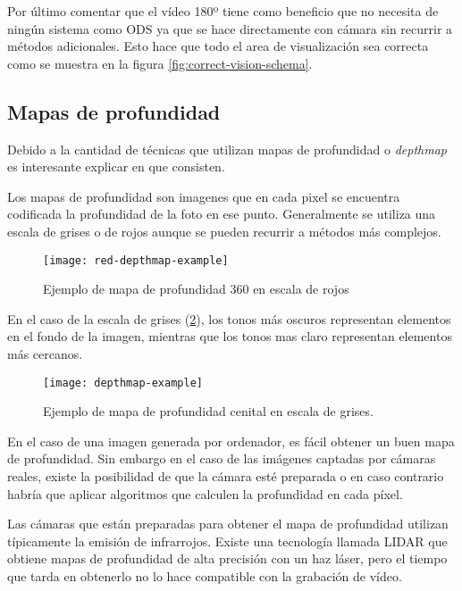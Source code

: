 Por último comentar que el vídeo 180º tiene como beneficio que no necesita de ningún sistema como ODS ya que se hace directamente con cámara sin recurrir a métodos adicionales. Esto hace que todo el area de visualización sea correcta como se muestra en la figura \ref{fig:correct-vision-schema}.

\subsection{Mapas de profundidad}
Debido a la cantidad de técnicas que utilizan mapas de profundidad o \textit{depthmap} es interesante explicar en que consisten. 

Los mapas de profundidad son imagenes que en cada pixel se encuentra codificada la profundidad de la foto en ese punto. Generalmente se utiliza una escala de grises o de rojos aunque se pueden recurrir a métodos más complejos.\cite{Josh6DoFUnity}

\begin{figure}[H]
  \centering
  \texttt{[image: red-depthmap-example]}
  \caption{Ejemplo de mapa de profundidad 360 en escala de rojos}
  \label{fig:red-depthmap-example}
\end{figure}
\FloatBarrier

En el caso de la escala de grises (\ref{fig:depthmap-example}), los tonos más oscuros representan elementos en el fondo de la imagen, mientras que los tonos mas claro representan elementos más cercanos.

\begin{figure}[H]
  \centering
  \texttt{[image: depthmap-example]}
  \caption{Ejemplo de mapa de profundidad cenital en escala de grises.}
  \label{fig:depthmap-example}
\end{figure}
\FloatBarrier

En el caso de una imagen generada por ordenador, es fácil obtener un buen mapa de profundidad. Sin embargo en el caso de las imágenes captadas por cámaras reales, existe la posibilidad de que la cámara esté preparada o en caso contrario habría que aplicar algoritmos que calculen la profundidad en cada píxel. 

Las cámaras que están preparadas para obtener el mapa de profundidad utilizan típicamente la emisión de infrarrojos. Existe una tecnología llamada LIDAR que obtiene mapas de profundidad de alta precisión con un haz láser, pero el tiempo que tarda en obtenerlo no lo hace compatible con la grabación de vídeo.

